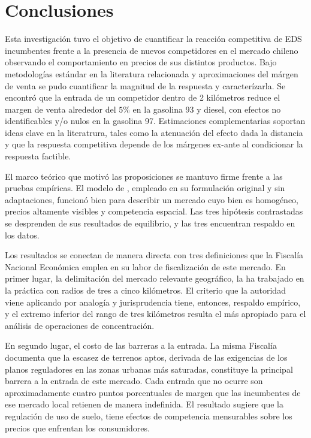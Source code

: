 \section{Conclusiones}

Esta investigación tuvo el objetivo de cuantificar la reacción competitiva de EDS incumbentes frente a la presencia de nuevos competidores en el mercado chileno observando el comportamiento en precios de sus distintos productos. Bajo metodologías estándar en la literatura relacionada y aproximaciones del márgen de venta se pudo cuantificar la magnitud de la respuesta y caracterízarla. Se encontró que la entrada de un competidor dentro de 2 kilómetros reduce el margen de venta alrededor del $5\%$ en la gasolina 93 y diesel, con efectos no identificables y/o nulos en la gasolina 97. Estimaciones complementarias soportan ideas clave en la literatrura, tales como la atenuación del efecto dada la distancia y  que la respuesta competitiva depende de los márgenes ex-ante al condicionar la respuesta factible. 

El marco teórico que motivó las proposiciones se mantuvo firme frente a las pruebas empíricas. El modelo de \textcite{SALOP1979}, empleado en su formulación original y sin adaptaciones, funcionó bien para describir un mercado cuyo bien es homogéneo, precios altamente visibles y competencia espacial. Las tres hipótesis contrastadas se desprenden de sus resultados de equilibrio, y las tres encuentran respaldo en los datos.

Los resultados se conectan de manera directa con tres definiciones que la Fiscalía Nacional Económica emplea en su labor de fiscalización de este mercado. En primer lugar, la delimitación del mercado relevante geográfico, la \textcite{FNE2021informe} ha trabajado en la práctica con radios de tres a cinco kilómetros. El criterio que la autoridad viene aplicando por analogía y jurisprudencia tiene, entonces, respaldo empírico, y el extremo inferior del rango de tres kilómetros resulta el más apropiado para el análisis de operaciones de concentración.

En segundo lugar, el costo de las barreras a la entrada. La misma Fiscalía documenta que la escasez de terrenos aptos, derivada de las exigencias de los planos reguladores en las zonas urbanas más saturadas, constituye la principal barrera a la entrada de este mercado. Cada entrada que no ocurre son aproximadamente cuatro puntos porcentuales de margen que las incumbentes de ese mercado local retienen de manera indefinida. El resultado sugiere que la regulación de uso de suelo, tiene efectos de competencia mensurables sobre los precios que enfrentan los consumidores.

